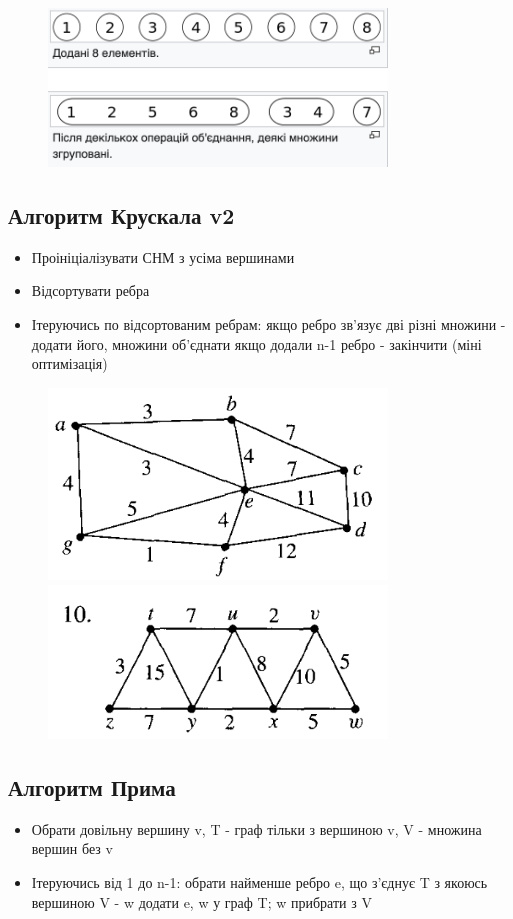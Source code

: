 \documentclass{article}
\begin{document}
\begin{figure}[h]
\centering
\includegraphics[width=90mm]{2}
\end{figure}

\subsection*{Алгоритм Крускала v2}
\begin{itemize}
    \item Проініціалізувати СНМ з усіма вершинами
    \item Відсортувати ребра
    \item Ітеруючись по відсортованим ребрам:
        \subitem якщо ребро зв'язує дві різні множини - додати його, множини об'єднати
        \subitem якщо додали n-1 ребро - закінчити (міні оптимізація)
\end{itemize}

\begin{figure}[h]
\centering
\includegraphics[width=90mm]{3}
\includegraphics[width=90mm]{4}
\end{figure}

\pagebreak

\subsection*{Алгоритм Прима}
\begin{itemize}
    \item Обрати довільну вершину v, T - граф тільки з вершиною v, V - множина вершин без v
    \item Ітеруючись від 1 до n-1:
        \subitem обрати найменше ребро e, що з'єднує T з якоюсь вершиною V - w
        \subitem додати e, w у граф T; w прибрати з V
\end{itemize}
\end{document}
